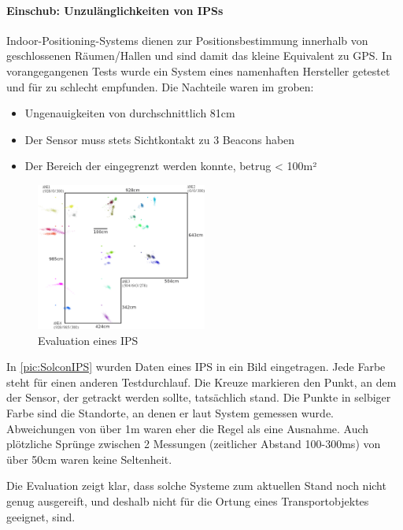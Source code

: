 \paragraph*{Einschub: Unzulänglichkeiten von IPSs}\label{subsubsec:IPS}

Indoor-Positioning-Systems dienen zur Positionsbestimmung innerhalb von geschlossenen Räumen/Hallen und sind damit das kleine Equivalent zu GPS. In vorangegangenen Tests wurde ein System eines namenhaften Hersteller getestet und für zu schlecht empfunden. Die Nachteile waren im groben:

\begin{itemize}
	\item Ungenauigkeiten von durchschnittlich 81cm
	\item Der Sensor muss stets Sichtkontakt zu 3 Beacons haben
	\item Der Bereich der eingegrenzt werden konnte, betrug < 100m²
\end{itemize}

\begin{figure}
	\includegraphics[width=0.5\textwidth,keepaspectratio]{graphics/Solcon/old.png}
	\caption{Evaluation eines IPS}
	\label{pic:SolconIPS}
\end{figure}

In \autoref{pic:SolconIPS} wurden Daten eines IPS in ein Bild eingetragen. Jede Farbe steht für einen anderen Testdurchlauf. Die Kreuze markieren den Punkt, an dem der Sensor, der getrackt werden sollte, tatsächlich stand. Die Punkte in selbiger Farbe sind die Standorte, an denen er laut System gemessen wurde. Abweichungen von über 1m waren eher die Regel als eine Ausnahme. Auch plötzliche Sprünge zwischen 2 Messungen (zeitlicher Abstand 100-300ms) von über 50cm waren keine Seltenheit.

Die Evaluation zeigt klar, dass solche Systeme zum aktuellen Stand noch nicht genug ausgereift, und deshalb nicht für die Ortung eines Transportobjektes geeignet, sind.

